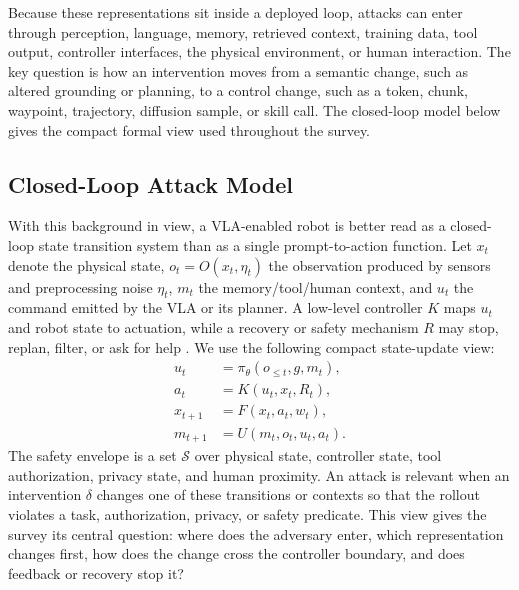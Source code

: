 Because these representations sit inside a deployed loop, attacks can enter through perception, language, memory, retrieved context, training data, tool output, controller interfaces, the physical environment, or human interaction. The key question is how an intervention moves from a semantic change, such as altered grounding or planning, to a control change, such as a token, chunk, waypoint, trajectory, diffusion sample, or skill call. The closed-loop model below gives the compact formal view used throughout the survey.

\subsection{Closed-Loop Attack Model}

With this background in view, a VLA-enabled robot is better read as a closed-loop state transition system than as a single prompt-to-action function. Let $x_t$ denote the physical state, $o_t=O(x_t,\eta_t)$ the observation produced by sensors and preprocessing noise $\eta_t$, $m_t$ the memory/tool/human context, and $u_t$ the command emitted by the VLA or its planner. A low-level controller $K$ maps $u_t$ and robot state to actuation, while a recovery or safety mechanism $R$ may stop, replan, filter, or ask for help \cite{ames2017control,alshiekh2018shielded,achiam2017constrained,dawson2023safecontrol}. We use the following compact state-update view:
\begin{equation}
\begin{aligned}
    u_t &= \pi_\theta(o_{\le t}, g, m_t),\\
    a_t &= K(u_t, x_t, R_t),\\
    x_{t+1} &= F(x_t, a_t, w_t),\\
    m_{t+1} &= U(m_t, o_t, u_t, a_t).
\end{aligned}
\label{eq:closed-loop-vla}
\end{equation}
The safety envelope is a set $\mathcal{S}$ over physical state, controller state, tool authorization, privacy state, and human proximity. An attack is relevant when an intervention $\delta$ changes one of these transitions or contexts so that the rollout violates a task, authorization, privacy, or safety predicate. This view gives the survey its central question: where does the adversary enter, which representation changes first, how does the change cross the controller boundary, and does feedback or recovery stop it?

